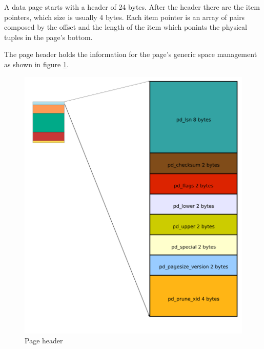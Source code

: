 A data page starts with a header of 24 bytes. After the 
header there are the item pointers, which size is usually 4 bytes. Each item 
pointer is an array of pairs composed by the offset and the length 
of the item which ponints the physical tuples in the page's bottom.\newline 

The page header holds the information for the page's generic space management as shown 
in figure \ref{fig:HEADERPAG01}. 


\begin{figure}[H]
\begin{center}

\includegraphics[scale=0.55]{images/header_page_01.png}

\caption{Page header}
\label{fig:HEADERPAG01} 
\end{center}

\end{figure}
